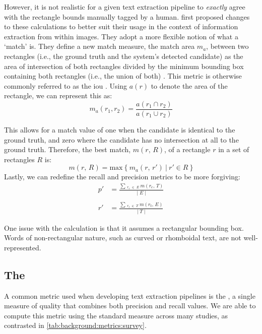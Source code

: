 However, it is not realistic for a given text extraction pipeline to \textit{exactly} agree with the rectangle bounds manually tagged by a human. \citet{Lucas:2003iw} first proposed changes to these calculations to better suit their usage in the context of information extraction from within images. They adopt a more flexible notion of what a `match' is. They define a new match measure, the match area $m_{a}$, between two rectangles (i.e., the ground truth and the system's detected candidate) as the area of intersection of both rectangles divided by the minimum bounding box containing both rectangles (i.e., the union of both) \citep{Lucas:2003iw, Lucas:2005bq, Lucas:2005hl}. This metric is otherwise commonly referred to as the \gls{iou} \citep{Karatzas:2015tj,Lin:2014vma,Jaderberg:2016wj}. Using $a(r)$ to denote the area of the rectangle, we can represent this as:
\begin{equation*}
  m_{a}(r_{1}, r_{2}) = \frac{a(r_{1} \cap r_{2})}{a(r_{1} \cup r_{2})}
\end{equation*}

This allows for a match value of one when the candidate is identical to the ground truth, and zero where the candidate has no intersection at all to the ground truth. Therefore, the best match, $m(r,\,R)$, of a rectangle $r$ in a set of rectangles $R$ is:
\begin{equation*}
  m(r,\,R) = \mathrm{max}~\{~m_{a}(r,\,r')~|~r' \in R~\}
\end{equation*}
\noindent
Lastly, we can redefine the recall and precision metrics to be more forgiving:
\begin{align*}
  p' &= \frac{\sum\,_{r_{e}\;\in\;E}~m(r_{e},\,T)}{\lvert\;E\;\rvert}\\\\
  r' &= \frac{\sum\,_{r_{t}\;\in\;T}~m(r_{t},\,E)}{\lvert\;T\;\rvert}
\end{align*}

One issue with the calculation is that it assumes a rectangular bounding box. Words of non-rectangular nature, such as curved or rhomboidal text, are not well-represented.

\subsection{The \fscore}
\label{sec:background:metrics:fscore}

A common metric used when developing text extraction pipelines is the \fscore, a single measure of quality that combines both precision and recall values. We are able to compute this metric using the standard measure across many studies, as contrasted in \cref{tab:background:metrics:survey}.

